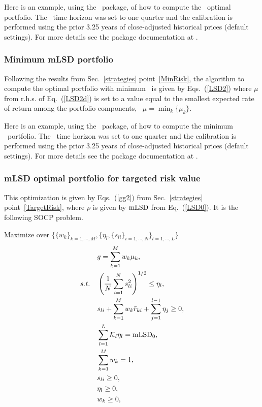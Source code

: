 \bigskip
\noindent Here is an example, using the \azapy\ package, of how to compute the \mLSD\ optimal portfolio.
The \mLSD\ time horizon was set to one quarter and the calibration is performed using the prior 3.25 years of
close-adjusted historical prices (default settings).
For more details see the package documentation at \azapydoc.



\BackToContents

\subsubsection{Minimum mLSD portfolio}
Following the results from Sec.~\ref{strategies} point~\ref{MinRisk}, the
algorithm to compute the optimal portfolio with minimum \mLSD\ is given by Eqs.~(\ref{LSD2}) where
$\mu$ from r.h.s. of Eq.~(\ref{LSD2d}) is set to a value equal to the smallest expected rate of
return among the portfolio components, \ie\ $\mu=\min_k\{\mu_k\}$.

\bigskip
\noindent Here is an example, using the \azapy\ package, of how to compute the minimum \mLSD\ portfolio.
The \mLSD\ time horizon was set to one quarter and the calibration is performed using the prior 3.25 years of
close-adjusted historical prices (default settings).
For more details see the package documentation at \azapydoc.



\BackToContents

\subsubsection{mLSD optimal portfolio for targeted risk value}
This optimization is given by Eqs.~(\ref{gg2}) from Sec.~\ref{strategies} point~\ref{TargetRisk}, where $\rho$ is
given by ${\rm mLSD}$ from Eq.~(\ref{LSD0}).
It is the following SOCP problem.

\bigskip
\noindent Maximize over $\{ \{w_k\}_{k=1,\cdots,M}, \{ \eta_l, \{ s_{li} \}_{i=1,\cdots,N} \}_{l=1,\cdots,L} \}$
\begin{subequations}\label{LSD4}
\begin{align}
    & g = \sum_{k=1}^M w_k \mu_k, \label{LSD4a} \\
    \st & \left( \frac{1}{N} \sum_{i=1}^N s_{li}^2 \right)^{1/2} \leq \eta_l, \label{LSD4b} \\
        & s_{li} + \sum_{k=1}^M w_k\br_{ki} + \sum_{j=1}^{l-1}\eta_j \geq 0, \label{LSD4c} \\
        & \sum_{l=1}^L \cK_l \eta_l = \mLSD_0, \label{LSD4d} \\
        & \sum_{k=1}^M w_k = 1, \label{LSS4e} \\
        & s_{li} \geq 0, \label{LSD4f} \\
        & \eta_l \geq 0, \label{LSD4h} \\
        & w_k \geq 0, \label{LSD4g}
\end{align}
\end{subequations}

